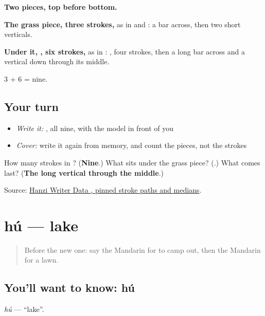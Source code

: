 \begin{quote}
\end{quote}

\textbf{Two pieces, top before bottom.}

\textbf{The grass piece, three strokes,} as in  and : a bar across, then two short verticals.

\textbf{Under it, , six strokes,} as in : , four strokes, then a long bar across and a vertical down through its middle.

3 + 6 = nine.

\subsection*{Your turn}
\begin{itemize}
\raggedright
  \item \emph{Write it:} , all nine, with the model in front of you
  \item \emph{Cover:} write it again from memory, and count the pieces, not the strokes
\end{itemize}

\begin{tcolorbox}[breakable,colback=teal!4,colframe=teal!35!black,title={Before you move on}]
How many strokes in ? (\textbf{Nine}.) What sits under the grass piece? (\textbf{}.) What comes last? (\textbf{The long vertical through the middle}.)

Source: \href{https://raw.githubusercontent.com/chanind/hanzi-writer-data/68d10a4b21150cae5e1ebbd223eed289cf32d90c/data/\%E8\%8D\%89.json}{Hanzi Writer Data , pinned stroke paths and medians}.
\end{tcolorbox}
\section[hú]{hú — lake}

\label{lesson:ZH-C226-hu}



\begin{quote}
Before the new one: say the Mandarin for to camp out, then the Mandarin for a lawn.
\end{quote}

\subsection*{You'll want to know: hú}
\emph{hú} — \textquotedblleft{}lake\textquotedblright{}.

